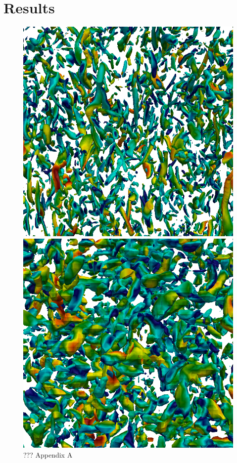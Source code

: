 \documentclass[11pt,a4paper,openany,oneside,parskip=half*]{article}
\begin{document}
\section{Results}
\begin{figure}[h]
    \centering
    \begin{minipage}{.5\textwidth}
        \centering
        \includegraphics[width=0.95\linewidth]{./Abbildungen/256_velocity_4.png}
        \caption{???}
        \label{256_velocity}
    \end{minipage}%
    \begin{minipage}{0.5\textwidth}
        \centering
        \includegraphics[width=0.95\linewidth]{./Abbildungen/64_velocity.png}
        \caption{??? Appendix A}
        \label{64_velocity}
    \end{minipage}
\end{figure}
\end{document}
